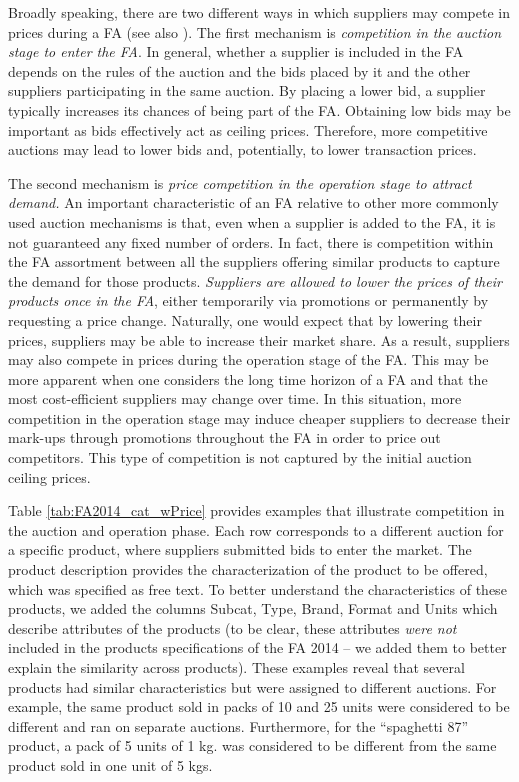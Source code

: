 Broadly speaking, there are two different ways in which suppliers may compete in prices during a FA (see also \cite{Demsetz68}). The first mechanism is \textit{competition in the auction stage to enter the FA}. In general,  whether a supplier is included  in the FA depends on the rules of the auction and the bids placed by it and the other suppliers participating in the same auction. By placing a lower bid, a supplier typically increases its chances of being part of the FA. Obtaining low bids may be important as bids effectively act as ceiling prices. Therefore, more competitive auctions may lead to lower bids and, potentially, to lower transaction prices. 

The second mechanism is \textit{price competition in the operation stage to attract demand.} An important characteristic of an FA relative to other more commonly used auction mechanisms is that, even when a supplier is added to the FA, it is not guaranteed any fixed number of orders. In fact, there is competition within the FA assortment between all the suppliers offering similar products to capture the demand for those products. \textit{Suppliers are allowed to lower the prices of their products once in the FA}, either temporarily via promotions or permanently by requesting a price change. Naturally, one would expect that by lowering their prices, suppliers may be able to increase their market share.  As a result, suppliers may also compete in prices during the operation stage of the FA.
{This may be more apparent when one considers the long time horizon of a FA and that the most cost-efficient suppliers may change over time. In this situation, more competition in the operation stage may induce cheaper suppliers to decrease their mark-ups through promotions throughout the FA  in order to price out competitors. This type of competition is not captured by the initial auction ceiling prices.}

{Table \ref{tab:FA2014_cat_wPrice} provides examples that illustrate competition in the auction and operation phase. Each row corresponds to a different auction for a specific product, where suppliers submitted bids to enter the market. The product description provides the characterization of the product to be offered, which was specified as free text. To better understand the characteristics of these products, we added the columns Subcat, Type, Brand, Format and Units which describe attributes of the products (to be clear, these attributes \textit{were not} included in the products specifications of the FA 2014 -- we added them to better explain the similarity across products). These examples reveal that several products had  similar characteristics but were assigned to different auctions. For example, the same product sold in packs of 10 and 25 units were considered to be different and ran on separate auctions. Furthermore, for the ``spaghetti 87'' product, a pack of 5 units of 1 kg. was considered to be different from the same product sold in one unit of 5 kgs.}



